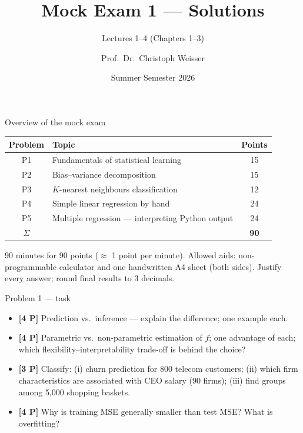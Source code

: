 \documentclass[aspectratio=169,11pt]{beamer}
\title{Mock Exam 1 --- Solutions}
\subtitle{Lectures 1--4 (Chapters 1--3)}
\author{Prof.\ Dr.\ Christoph Weisser}\institute{Quantitative Research Methods \textperiodcentered\ HSBI}
\date{Summer Semester 2026}\graphicspath{{images/}}
\begin{document}
\begin{frame}[plain]\titlepage\end{frame}

\begin{frame}{Overview of the mock exam}
  \footnotesize
  \begin{center}
  \begin{tabular}{@{}clc@{}}
    \toprule
    \textbf{Problem} & \textbf{Topic} & \textbf{Points}\\
    \midrule
    P1 & Fundamentals of statistical learning & 15\\
    P2 & Bias--variance decomposition & 15\\
    P3 & $K$-nearest neighbours classification & 12\\
    P4 & Simple linear regression by hand & 24\\
    P5 & Multiple regression --- interpreting Python output & 24\\
    \midrule
    $\Sigma$ & & \textbf{90}\\
    \bottomrule
  \end{tabular}
  \end{center}
  \vspace{2pt}
  \begin{takeaway}
    90 minutes for 90 points ($\approx$ 1 point per minute). Allowed aids: non-programmable
    calculator and one handwritten A4 sheet (both sides). Justify every answer; round final
    results to 3 decimals.
  \end{takeaway}
\end{frame}

\begin{frame}{Problem 1 --- task}
  \begin{exercise}
    \begin{itemize}
      \item[(a)] \textbf{[4 P]} Prediction vs.\ inference --- explain the difference; one example each.
      \item[(b)] \textbf{[4 P]} Parametric vs.\ non-parametric estimation of $f$; one advantage of each;
        which flexibility--interpretability trade-off is behind the choice?
      \item[(c)] \textbf{[3 P]} Classify: (i) churn prediction for 800 telecom customers;
        (ii) which firm characteristics are associated with CEO salary (90 firms);
        (iii) find groups among 5{,}000 shopping baskets.
      \item[(d)] \textbf{[4 P]} Why is training MSE generally smaller than test MSE? What is overfitting?
    \end{itemize}
  \end{exercise}
\end{frame}
\end{document}
